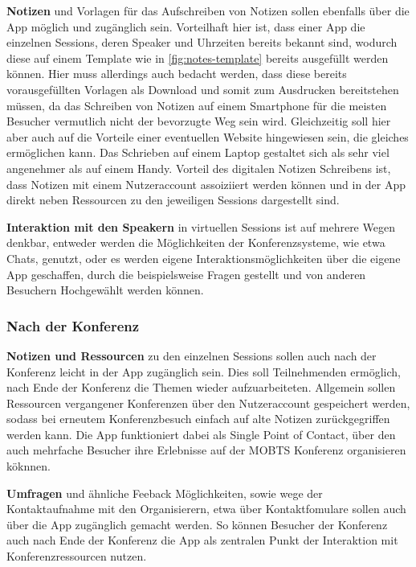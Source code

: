 \textbf{Notizen} und Vorlagen für das Aufschreiben von Notizen sollen ebenfalls über die App möglich und zugänglich sein.
Vorteilhaft hier ist, dass einer App die einzelnen Sessions, deren Speaker und Uhrzeiten bereits bekannt sind, wodurch diese auf einem Template wie in \autoref{fig:notes-template} bereits ausgefüllt werden können.
Hier muss allerdings auch bedacht werden, dass diese bereits vorausgefüllten Vorlagen als Download und somit zum Ausdrucken bereitstehen müssen, da das Schreiben von Notizen auf einem Smartphone für die meisten Besucher vermutlich nicht der bevorzugte Weg sein wird.
Gleichzeitig soll hier aber auch auf die Vorteile einer eventuellen Website hingewiesen sein, die gleiches ermöglichen kann.
Das Schrieben auf einem Laptop gestaltet sich als sehr viel angenehmer als auf einem Handy.
Vorteil des digitalen Notizen Schreibens ist, dass Notizen mit einem Nutzeraccount assoiziiert werden können und in der App direkt neben Ressourcen zu den jeweiligen Sessions dargestellt sind.

\textbf{Interaktion mit den Speakern} in virtuellen Sessions ist auf mehrere Wegen denkbar, entweder werden die Möglichkeiten der Konferenzsysteme, wie etwa Chats, genutzt, oder es werden eigene Interaktionsmöglichkeiten über die eigene App geschaffen, durch die beispielsweise Fragen gestellt und von anderen Besuchern Hochgewählt werden können.

\subsubsection*{Nach der Konferenz}
\textbf{Notizen und Ressourcen} zu den einzelnen Sessions sollen auch nach der Konferenz leicht in der App zugänglich sein.
Dies soll Teilnehmenden ermöglich, nach Ende der Konferenz die Themen wieder aufzuarbeiteten.
Allgemein sollen Ressourcen vergangener Konferenzen über den Nutzeraccount gespeichert werden, sodass bei erneutem Konferenzbesuch einfach auf alte Notizen zurückgegriffen werden kann.
Die App funktioniert dabei als Single Point of Contact, über den auch mehrfache Besucher ihre Erlebnisse auf der \ac{MOBTS} Konferenz organisieren köknnen.

\textbf{Umfragen} und ähnliche Feeback Möglichkeiten, sowie wege der Kontaktaufnahme mit den Organisierern, etwa über Kontaktfomulare sollen auch über die App zugänglich gemacht werden.
So können Besucher der Konferenz auch nach Ende der Konferenz die App als zentralen Punkt der Interaktion mit Konferenzressourcen nutzen.
 
